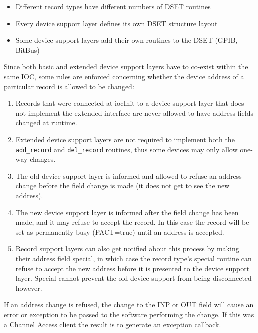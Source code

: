 \begin{itemize}
\item Different record types have different numbers of DSET routines

\item Every device support layer defines its own DSET structure layout

\item Some device support layers add their own routines to the DSET (GPIB, BitBus)

\end{itemize}

Since both basic and extended device support layers have to co-exist within the same IOC, some rules are enforced 
concerning whether the device address of a particular record is allowed to be changed:

\begin{enumerate}
\item Records that were connected at iocInit to a device support layer that does not implement the extended interface are 
never allowed to have address fields changed at runtime.

\item Extended device support layers are not required to implement both the \verb|add_record| and \verb|del_record| routines, 
thus some devices may only allow one-way changes.

\item The old device support layer is informed and allowed to refuse an address change before the field change is made 
(it does not get to see the new address).

\item The new device support layer is informed after the field change has been made, and it may refuse to accept the 
record.  In this case the record will be set as permanently busy (PACT=true) until an address is accepted.

\item Record support layers can also get notified about this process by making their address field special, in which case 
the record type's special routine can refuse to accept the new address before it is presented to the device support 
layer. Special cannot prevent the old device support from being disconnected however.

\end{enumerate}

If an address change is refused, the change to the INP or OUT field will cause an error or exception to be passed to the 
software performing the change. If this was a Channel Access client the result is to generate an exception callback.

